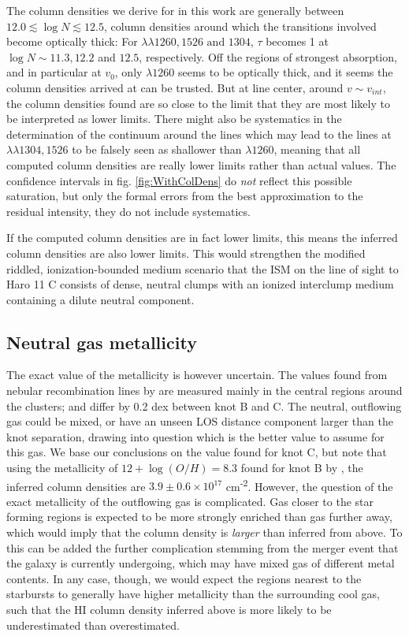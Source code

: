 \documentclass[twocolumn]{aastex61}
\begin{document}
The column densities we derive for  in this work are
generally between $12.0 \lesssim \log N \lesssim 12.5$, column densities
around which the transitions involved become optically thick: For
$\lambda \lambda 1260, 1526 \text{ and } 1304$, $\tau$ becomes 1 at
$\log N \sim 11.3, 12.2$ and $12.5$, respectively. Off the regions of
strongest absorption, and in particular at $v_0$, only $\lambda 1260$
seems to be optically thick, and it seems the column densities arrived
at can be trusted. But at line center, around $v\sim v_{int}$, the
column densities found are so close to the limit that they are most
likely to be interpreted as lower limits. There might also be
systematics in the determination of the continuum around the lines which
may lead to the lines at $\lambda \lambda 1304, 1526$ to be falsely seen
as shallower than $\lambda 1260$, meaning that all computed column
densities are really lower limits rather than actual values. The
confidence intervals in fig. \ref{fig:WithColDens} do \emph{not} reflect
this possible saturation, but only the formal errors from the best
approximation to the residual intensity, they do not include
systematics.

If the computed column densities are in fact lower limits, this means
the inferred  column densities are also lower limits. This
would strengthen the modified riddled, ionization-bounded medium
scenario that the ISM on the line of sight to Haro 11 C consists of
dense, neutral clumps with an ionized interclump medium containing a
dilute neutral component.

\subsection{Neutral gas metallicity}\label{neutral-gas-metallicity}

The exact value of the metallicity is however uncertain. The values
found from nebular recombination lines by \citet{Guseva2012} are
measured mainly in the central  regions around the clusters;
and differ by 0.2 dex between knot B and C. The neutral, outflowing gas
could be mixed, or have an unseen LOS distance component larger than the
knot separation, drawing into question which is the better value to
assume for this gas. We base our conclusions on the value found for knot
C, but note that using the metallicity of $12 + \log (O/H) = 8.3$ found
for knot B by \citet{Guseva2012}, the inferred  column
densities are $3.9 \pm 0.6 \times 10^{17}$ cm\textsuperscript{-2}.
However, the question of the exact metallicity of the outflowing gas is
complicated. Gas closer to the star forming regions is expected to be
more strongly enriched than gas further away, which would imply that the
 column density is \emph{larger} than inferred from
 above. To this can be added the further complication
stemming from the merger event that the galaxy is currently undergoing,
which may have mixed gas of different metal contents. In any case,
though, we would expect the regions nearest to the starbursts to
generally have higher metallicity than the surrounding cool gas, such
that the HI column density inferred above is more likely to be
underestimated than overestimated.
\end{document}
